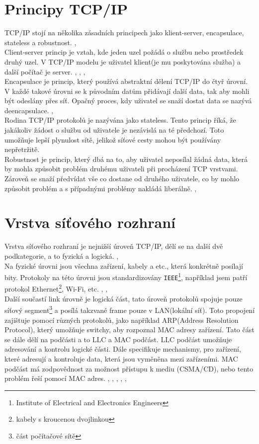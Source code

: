 \documentclass[12pt]{report}			%
\begin{document}
			\section{Principy TCP/IP}
			TCP/IP stojí na několika zásadních principech jako klient-server, encapsulace, stateless a robustnost. \cite{Princip5}, \cite{Princip4}
\\
Client-server princip je vztah, kde jeden uzel požádá o službu nebo
 prostředek druhý uzel. V TCP/IP modelu je uživatel klient(je mu poskytována služba) a další počítač je server. \cite{zakladykomunikace1}, \cite{Princip5}, \cite{Princip1}, \cite{Princip3}
\\
Encapsulace je princip, který používá abstraktní dělení TCP/IP do čtyř úrovní. V každé takové úrovni se k původním datům přidávají další data, tak aby mohli být odeslány přes síť. Opačný proces, kdy uživatel se snaží dostat data se nazývá deencapsulace. \cite{zakladykomunikace1}, \cite{Princip5} 
\\
Rodina TCP/IP protokolů je nazývána jako stateless. Tento princip říká, že jakákoliv žádost o službu od uživatele je nezávislá na té předchozí. Toto umožňuje lepší plynulost sítě, jelikož síťové cesty mohou být používány nepřetržitě. \cite{Princip5}
\\
Robustnost je princip, který dbá na to, aby uživatel neposílal žádná data, která by mohla způsobit problém druhému uživateli při procházení TCP vrstvami. Zároveň se snaží předvídat vše co dostane od druhého uživatele, co by mohlo způsobit problém a s případnými problémy nakládá liberálně. \cite{Princip5}, \cite{Princip6}
			
			
			\section{Vrstva síťového rozhraní}
			Vrstva síťového rozhraní je nejnižší úroveň TCP/IP, dělí se na další dvě podkategorie, a to fyzická a logická. \cite{Princip5}, \cite{Link4}
\\
Na fyzické úrovni jsou všechna zařízení, kabely a etc., která konkrétně posílají bity. Protokoly na této úrovni jsou standardizovány \texttt{IEEE}\footnote{Institute of Electrical and Electronics Engineers}, například jsem patří protokol Ethernet\footnote{kabely s kroucenou dvojlinkou}, Wi-Fi, etc. \cite{Princip5}, \cite{Link2}, \cite{Link3}
 \\
Další součastí link úrovně je logická část, tato úroveň protokolů spojuje pouze síťový segment\footnote{část počítačové sítě} a posílá takzvané frame pouze v LAN(lokální síť). Toto propojení zajištuje pomocí různých protokolů, jako například ARP(Address Resolution Protocol), který umožňuje switchy, aby rozpoznal MAC adresy zařízení. Tato část se dále dělí na podčásti a to LLC a MAC podčást. LLC podčást umožňuje adresování a kontrolu logické části. Dále specifikuje mechanismy, pro zařízení, které adresují a kontroluje data, která jsou vyměněna mezi zařízeními. MAC podčást má zodpovědnost za možnost přístupu k mediu (CSMA/CD), nebo tento problém řeší pomocí MAC adres. \cite{Princip5}, \cite{Link2}, \cite{Link3}, \cite{Link4}, \cite{Link5}, \cite{Link6}
\end{document}
